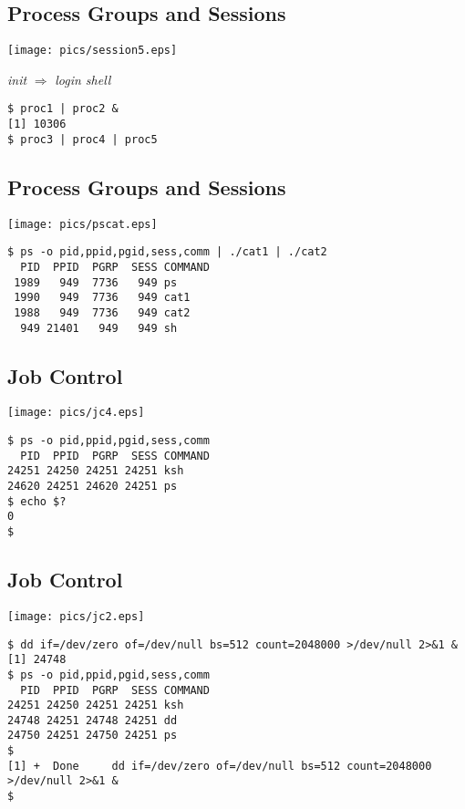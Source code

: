 \documentclass[xga]{xdvislides}
\begin{document}
\subsection{Process Groups and Sessions}
\begin{center}
	\texttt{[image: pics/session5.eps]}
\end{center}

{\em init} $\Rightarrow$ {\em login shell}
\begin{verbatim}
$ proc1 | proc2 &
[1] 10306
$ proc3 | proc4 | proc5
\end{verbatim}


\subsection{Process Groups and Sessions}
\begin{center}
	\texttt{[image: pics/pscat.eps]}
\end{center}
\begin{verbatim}
$ ps -o pid,ppid,pgid,sess,comm | ./cat1 | ./cat2
  PID  PPID  PGRP  SESS COMMAND
 1989   949  7736   949 ps
 1990   949  7736   949 cat1
 1988   949  7736   949 cat2
  949 21401   949   949 sh
\end{verbatim}


\subsection{Job Control}
\begin{center}
	\texttt{[image: pics/jc4.eps]}
\end{center}
\addvspace{.5in}
\begin{verbatim}
$ ps -o pid,ppid,pgid,sess,comm
  PID  PPID  PGRP  SESS COMMAND
24251 24250 24251 24251 ksh
24620 24251 24620 24251 ps
$ echo $?
0
$
\end{verbatim}

\subsection{Job Control}
\begin{center}
	\texttt{[image: pics/jc2.eps]}
\end{center}
\begin{verbatim}
$ dd if=/dev/zero of=/dev/null bs=512 count=2048000 >/dev/null 2>&1 &
[1]	24748
$ ps -o pid,ppid,pgid,sess,comm
  PID  PPID  PGRP  SESS COMMAND
24251 24250 24251 24251 ksh
24748 24251 24748 24251 dd
24750 24251 24750 24251 ps
$
[1] +  Done     dd if=/dev/zero of=/dev/null bs=512 count=2048000 >/dev/null 2>&1 &
$
\end{verbatim}
\end{document}
